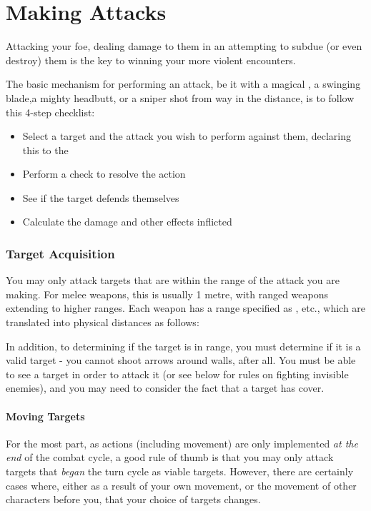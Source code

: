 
\chapter{Making Attacks}\label{S:Attacks} 

Attacking your foe, dealing damage to them in an attempting to subdue (or even destroy) them is the key to winning your more violent encounters. 

The basic mechanism for performing an attack, be it with a magical , a swinging blade,a mighty headbutt, or a sniper shot from way in the distance, is to follow this 4-step checklist:

\begin{itemize}
	\item Select a target and the attack you wish to perform against them, declaring this to the 
	\item Perform a check to resolve the action 
	\item See if the target defends themselves
	\item Calculate the damage and other effects inflicted
\end{itemize}

\subsection{Target Acquisition}

You may only attack targets that are within the range of the attack you are making. For melee weapons, this is usually 1 metre, with ranged weapons extending to higher ranges. Each weapon has a range specified as ,  etc., which are translated into physical distances as follows:

\rangetable{}

In addition, to determining if the target is in range, you must determine if it is a valid target - you cannot shoot arrows around walls, after all. You must be able to see a target in order to attack it (or see below for rules on fighting invisible enemies), and you may need to consider the fact that a target has cover. 

\subsubsection{Moving Targets}

For the most part, as actions (including movement) are only implemented {\it at the end} of the combat cycle, a good rule of thumb is that you may only attack targets that {\it began} the turn cycle as viable targets. However, there are certainly cases where, either as a result of your own movement, or the movement of other characters before you, that your choice of targets changes. 

